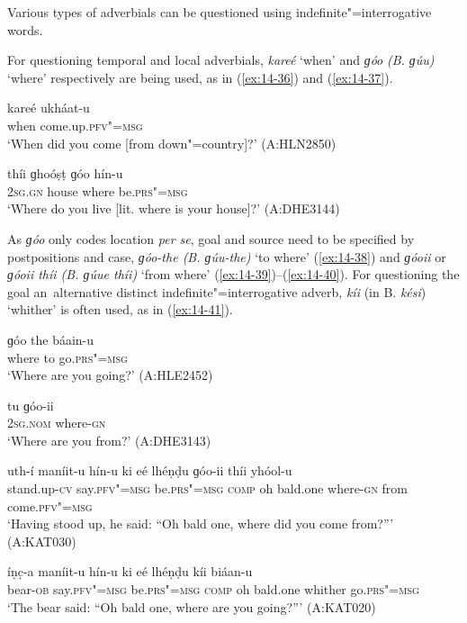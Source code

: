  Various types of adverbials can be questioned using indefinite"=interrogative words.


For questioning temporal and local adverbials, \textit{kareé} `when' and \textit{ɡóo} \textit{(B. ɡúu)} `where' respectively are being used, as in (\ref{ex:14-36}) and (\ref{ex:14-37}). 

\begin{exe}
\ex
\label{ex:14-36}
\gll kareé ukháat-u \\
when come.up.\textsc{pfv"=msg} \\
\glt `When did you come [from down"=country]?' (A:HLN2850)

\ex
\label{ex:14-37}
\gll thíi ɡhoóṣṭ ɡóo hín-u \\
\textsc{2sg.gn} house where be.\textsc{prs"=msg} \\
\glt `Where do you live [lit. where is your house]?' (A:DHE3144)
\end{exe}

As \textit{ɡóo} only codes location \textit{per se}, goal and source need to be specified by postpositions and case, \textit{ɡóo-the (B. ɡúu-the)} `to where' (\ref{ex:14-38}) and \textit{ɡóoii} or \textit{ɡóoii thíi (B. ɡúue thíi)} `from where' (\ref{ex:14-39})--(\ref{ex:14-40}). For questioning the goal an~alternative distinct indefinite"=interrogative adverb, \textit{kíi} (in B. \textit{kési}) `whither' is often used, as in (\ref{ex:14-41}).

\begin{exe}
\ex
\label{ex:14-38}
\gll ɡóo the báain-u \\
where to go.\textsc{prs"=msg } \\
\glt `Where are you going?' (A:HLE2452)

\ex
\label{ex:14-39}
\gll tu ɡóo-ii \\
\textsc{2sg.nom} where-\textsc{gn}  \\
\glt `Where are you from?' (A:DHE3143)

\ex
\label{ex:14-40}
\gll uth-í maníit-u hín-u ki eé  lhéṇḍu ɡóo-ii thíi yhóol-u \\
stand.up-\textsc{cv} say.\textsc{pfv"=msg} be.\textsc{prs"=msg} \textsc{comp} oh bald.one where-\textsc{gn} from come.\textsc{pfv"=msg} \\
\glt `Having stood up, he said: ``Oh bald one, where did you come from?''' (A:KAT030)

\ex
\label{ex:14-41}
\gll íṇc̣-a maníit-u hín-u ki eé lhéṇḍu  kíi biáan-u \\
bear-\textsc{ob} say.\textsc{pfv"=msg} be.\textsc{prs"=msg} \textsc{comp} oh bald.one whither go.\textsc{prs"=msg} \\
\glt `The bear said: ``Oh bald one, where are you going?''' (A:KAT020)
\end{exe}

